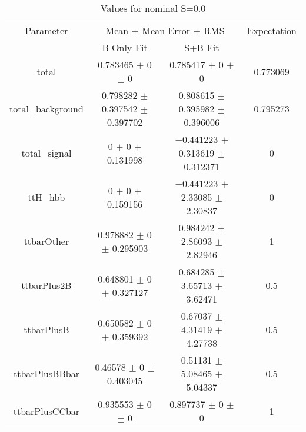 \begin{table}
\centering
\caption{Values for nominal S=0.0}
\begin{tabular}{cccc}
\toprule
Parameter & \multicolumn{2}{c}{Mean $\pm$ Mean Error $\pm$ RMS} & Expectation\\
 & B-Only Fit & S+B Fit & \\
\midrule
total & \num{0.783465} $\pm$ \num{0} $\pm$ \num{0} & \num{0.785417} $\pm$ \num{0} $\pm$ \num{0} & \num{0.773069}\\
total\_background & \num{0.798282} $\pm$ \num{0.397542} $\pm$ \num{0.397702} & \num{0.808615} $\pm$ \num{0.395982} $\pm$ \num{0.396006} & \num{0.795273}\\
total\_signal & \num{0} $\pm$ \num{0} $\pm$ \num{0.131998} & \num{-0.441223} $\pm$ \num{0.313619} $\pm$ \num{0.312371} & \num{0}\\
ttH\_hbb & \num{0} $\pm$ \num{0} $\pm$ \num{0.159156} & \num{-0.441223} $\pm$ \num{2.33085} $\pm$ \num{2.30837} & \num{0}\\
ttbarOther & \num{0.978882} $\pm$ \num{0} $\pm$ \num{0.295903} & \num{0.984242} $\pm$ \num{2.86093} $\pm$ \num{2.82946} & \num{1}\\
ttbarPlus2B & \num{0.648801} $\pm$ \num{0} $\pm$ \num{0.327127} & \num{0.684285} $\pm$ \num{3.65713} $\pm$ \num{3.62471} & \num{0.5}\\
ttbarPlusB & \num{0.650582} $\pm$ \num{0} $\pm$ \num{0.359392} & \num{0.67037} $\pm$ \num{4.31419} $\pm$ \num{4.27738} & \num{0.5}\\
ttbarPlusBBbar & \num{0.46578} $\pm$ \num{0} $\pm$ \num{0.403045} & \num{0.51131} $\pm$ \num{5.08465} $\pm$ \num{5.04337} & \num{0.5}\\
ttbarPlusCCbar & \num{0.935553} $\pm$ \num{0} $\pm$ \num{0} & \num{0.897737} $\pm$ \num{0} $\pm$ \num{0} & \num{1}\\
\bottomrule
\end{tabular}
\end{table}
